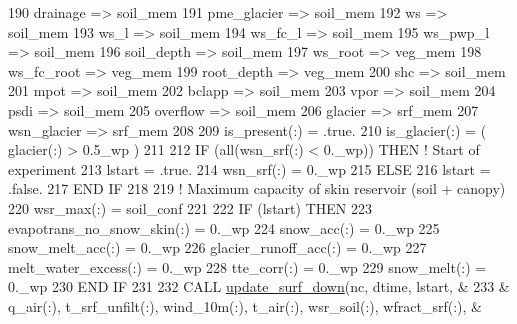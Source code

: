 \begin{DoxyCode}
190     drainage       => soil\_mem %
191     pme\_glacier    => soil\_mem %
192     ws             => soil\_mem %
193     ws\_l           => soil\_mem %
194     ws\_fc\_l        => soil\_mem %
195     ws\_pwp\_l       => soil\_mem %
196     soil\_depth     => soil\_mem %
197     ws\_root        => veg\_mem  %
198     ws\_fc\_root     => veg\_mem  %
199     root\_depth     => veg\_mem  %
200     shc            => soil\_mem %
201     mpot           => soil\_mem %
202     bclapp         => soil\_mem %
203     vpor           => soil\_mem %
204     psdi           => soil\_mem %
205     overflow       => soil\_mem %
206     glacier        => srf\_mem  %
207     wsn\_glacier    => srf\_mem  %
208 
209     is\_present(:)    = .true.
210     is\_glacier(:)    = ( glacier(:) > 0.5\_wp )
211 
212     \textcolor{keywordflow}{IF} (all(wsn\_srf(:) < 0.\_wp)) \textcolor{keywordflow}{THEN}          \textcolor{comment}{! Start of experiment}
213       lstart = .true.
214       wsn\_srf(:) = 0.\_wp
215     \textcolor{keywordflow}{ELSE}
216       lstart = .false.
217 \textcolor{keywordflow}{    END IF}
218 
219     \textcolor{comment}{! Maximum capacity of skin reservoir (soil + canopy)}
220     wsr\_max(:) = soil\_conf%
221 
222     \textcolor{keywordflow}{IF} (lstart) \textcolor{keywordflow}{THEN}
223       evapotrans\_no\_snow\_skin(:) = 0.\_wp
224       snow\_acc(:) = 0.\_wp
225       snow\_melt\_acc(:) = 0.\_wp
226       glacier\_runoff\_acc(:) = 0.\_wp
227       melt\_water\_excess(:) = 0.\_wp
228       tte\_corr(:) = 0.\_wp
229       snow\_melt(:) = 0.\_wp
230 \textcolor{keywordflow}{    END IF}
231 
232     \textcolor{keyword}{CALL }\hyperlink{namespacemo__soil__process_a7dd6c425ac02aef924fb1fa3de6b373d}{update\_surf\_down}(nc, dtime, lstart, &
233       & q\_air(:), t\_srf\_unfilt(:), wind\_10m(:), t\_air(:), wsr\_soil(:), wfract\_srf(:), &

\end{DoxyCode}
